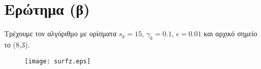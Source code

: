 \chapter{Ερώτημα (β)}


Τρέχουμε τον αλγόριθμο με ορίσματα $s_k = 15$, $\gamma_k = 0.1$, $\epsilon = 0.01$ και αρχικό σημείο το (8,3).

\begin{figure}[htp]
	\centerfloat
	\setlength\figureheight{10cm}
	\setlength\figurewidth{10cm}
	\texttt{[image: surfz.eps]}
%	
	\label{fig:untitled}
\end{figure}
